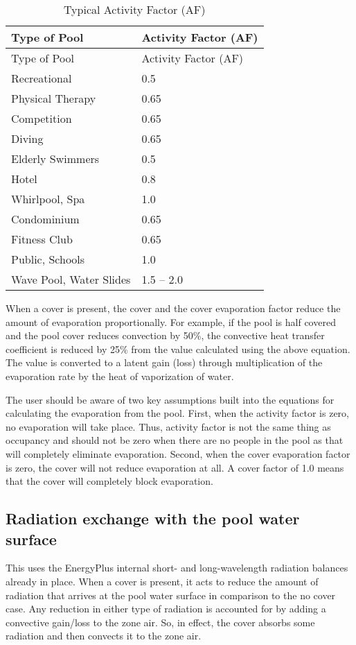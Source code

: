 \begin{longtable}[c]{@{}ll@{}}
\caption{Typical Activity Factor (AF) \label{table:typical-activity-factor-af}} \tabularnewline
\toprule 
Type of Pool & Activity Factor (AF) \tabularnewline
\midrule
\endfirsthead

\toprule 
Type of Pool & Activity Factor (AF) \tabularnewline
\midrule
\endhead

Recreational & 0.5 \tabularnewline
Physical Therapy & 0.65 \tabularnewline
Competition & 0.65 \tabularnewline
Diving & 0.65 \tabularnewline
Elderly Swimmers & 0.5 \tabularnewline
Hotel & 0.8 \tabularnewline
Whirlpool, Spa & 1.0 \tabularnewline
Condominium & 0.65 \tabularnewline
Fitness Club & 0.65 \tabularnewline
Public, Schools & 1.0 \tabularnewline
Wave Pool, Water Slides & 1.5 – 2.0 \tabularnewline
\bottomrule
\end{longtable}

When a cover is present, the cover and the cover evaporation factor reduce the amount of evaporation proportionally. For example, if the pool is half covered and the pool cover reduces convection by 50\%, the convective heat transfer coefficient is reduced by 25\% from the value calculated using the above equation. The value is converted to a latent gain (loss) through multiplication of the evaporation rate by the heat of vaporization of water.

The user should be aware of two key assumptions built into the equations for calculating the evaporation from the pool.  First, when the activity factor is zero, no evaporation will take place.  Thus, activity factor is not the same thing as occupancy and should not be zero when there are no people in the pool as that will completely eliminate evaporation.  Second, when the cover evaporation factor is zero, the cover will not reduce evaporation at all.  A cover factor of 1.0 means that the cover will completely block evaporation.

\subsection{Radiation exchange with the pool water surface}\label{radiation-exchange-with-the-pool-water-surface}

This uses the EnergyPlus internal short- and long-wavelength radiation balances already in place. When a cover is present, it acts to reduce the amount of radiation that arrives at the pool water surface in comparison to the no cover case. Any reduction in either type of radiation is accounted for by adding a convective gain/loss to the zone air. So, in effect, the cover absorbs some radiation and then convects it to the zone air.

